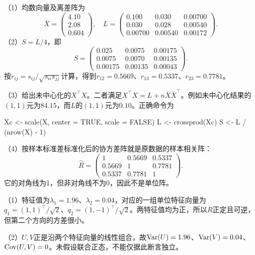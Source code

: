 （1）均数向量及离差阵为
\[
\bar X=\begin{pmatrix}4.10\\2.08\\0.604\end{pmatrix},\quad
L=\begin{pmatrix}0.100&0.030&0.00700\\0.030&0.028&0.00540\\0.00700&0.00540&0.00172\end{pmatrix}.
\]
（2）$S=L/4$，即
\[
S=\begin{pmatrix}0.025&0.0075&0.00175\\0.0075&0.0070&0.00135\\0.00175&0.00135&0.00043\end{pmatrix}.
\]
按$r_{ij}=s_{ij}/\sqrt{s_{ii}s_{jj}}$计算，得到$r_{12}=0.5669$、$r_{13}=0.5337$、$r_{23}=0.7781$。

（3）给出未中心化的$X^\top X$。二者满足$X^\top X=L+n\bar X\bar X^\top$。例如未中心化结果的$(1,1)$元为$84.15$，而$L$的$(1,1)$元为$0.10$。正确命令为

\begin{rcode}
Xc <- scale(X, center = TRUE, scale = FALSE)
L <- crossprod(Xc)
S <- L / (nrow(X) - 1)
\end{rcode}
（4）按样本标准差标准化后的协方差阵就是原数据的样本相关阵：
\[
\widehat R=\begin{pmatrix}1&0.5669&0.5337\\0.5669&1&0.7781\\0.5337&0.7781&1\end{pmatrix}.
\]
它的对角线为1，但非对角线不为0，因此不是单位阵。
\par\nobreak\smallskip{}

（1）特征值为$\lambda_1=1.96$、$\lambda_2=0.04$，对应的一组单位特征向量为$q_1=(1,1)^\top/\sqrt2$、$q_2=(1,-1)^\top/\sqrt2$。两特征值均为正，所以$R$正定且可逆，但第二个方向的方差很小。

（2）$U,V$正是沿两个特征向量的线性组合，故$\operatorname{Var}(U)=1.96$、$\operatorname{Var}(V)=0.04$、$\operatorname{Cov}(U,V)=0$。未假设联合正态，不能仅据此断言独立。

